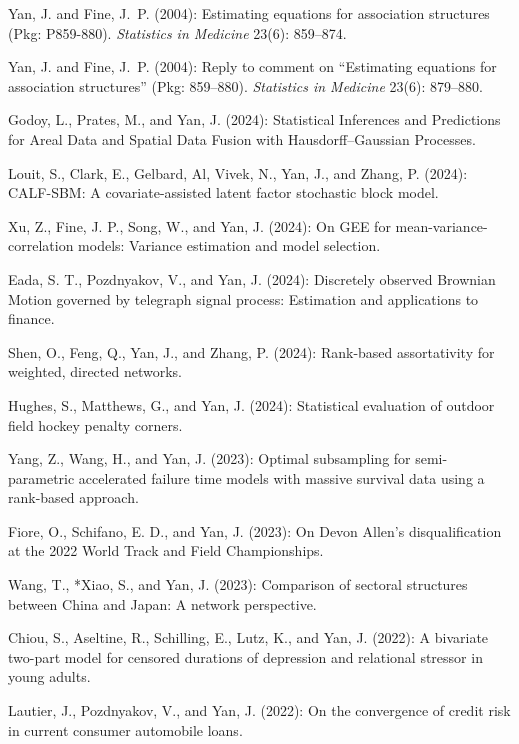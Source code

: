 \documentclass[Statistics]{vita}
\begin{document}
\begin{vita}
\begin{Publications}
\begin{RefereedJournalArticles}
  \item Yan, J. and Fine, J.~P. (2004): Estimating equations for association structures ({P}kg: P859-880). {\em Statistics in Medicine\/} 23(6): 859--874.
  \item Yan, J. and Fine, J.~P. (2004): Reply to comment on ``{E}stimating equations for association structures'' ({P}kg: 859--880). {\em Statistics in Medicine\/} 23(6): 879--880.
  \end{RefereedJournalArticles}
  \begin{UnderReview}
  \item *Godoy, L., Prates, M., and Yan, J. (2024): Statistical Inferences and Predictions for Areal Data and Spatial Data Fusion with Hausdorff–Gaussian Processes.
  \item *Louit, S., Clark, E., Gelbard, Al, Vivek, N., Yan, J., and Zhang, P. (2024): CALF-SBM: A covariate-assisted latent factor stochastic block model.
  \item *Xu, Z., Fine, J. P., Song, W., and Yan, J. (2024): On GEE for mean-variance-correlation models: Variance estimation and model selection.
  \item *Eada, S. T., Pozdnyakov, V., and Yan, J. (2024): Discretely observed Brownian Motion governed by telegraph signal process: Estimation and applications to finance.
  \item Shen, O., Feng, Q., Yan, J., and Zhang, P. (2024): Rank-based assortativity for weighted, directed networks.
  \item *Hughes, S., Matthews, G., and Yan, J. (2024): Statistical evaluation of outdoor field hockey penalty corners.
  \item *Yang, Z., Wang, H., and Yan, J. (2023): Optimal subsampling for semi-parametric accelerated failure time models with massive survival data using a rank-based approach.
  \item *Fiore, O., Schifano, E. D., and Yan, J. (2023): On Devon Allen’s disqualification at the 2022 World Track and Field Championships.
  \item *Wang, T., *Xiao, S., and Yan, J. (2023): Comparison of sectoral structures between China and Japan: A network perspective.
  \item Chiou, S., Aseltine, R., Schilling, E., Lutz, K., and Yan, J. (2022): A bivariate two-part model for censored durations of depression and relational stressor in young adults.
  \item *Lautier, J., Pozdnyakov, V., and Yan, J. (2022): On the convergence of credit risk in current consumer automobile loans.

\end{UnderReview}
\end{Publications}
\end{vita}
\end{document}
